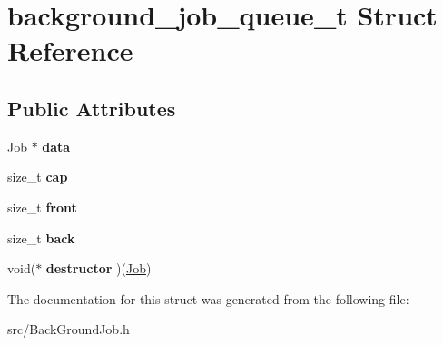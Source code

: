 \hypertarget{structbackground__job__queue__t}{\section{background\-\_\-job\-\_\-queue\-\_\-t Struct Reference}
\label{structbackground__job__queue__t}
}
\subsection*{Public Attributes}
\begin{DoxyCompactItemize}
\item 
\hypertarget{structbackground__job__queue__t_a8d3f674d7d98f8d7a212831d4599e713}{\hyperlink{structJob}{Job} $\ast$ {\bfseries data}}\label{structbackground__job__queue__t_a8d3f674d7d98f8d7a212831d4599e713}

\item 
\hypertarget{structbackground__job__queue__t_a8b5d447ed2865ebc3ad0c03a487be15b}{size\-\_\-t {\bfseries cap}}\label{structbackground__job__queue__t_a8b5d447ed2865ebc3ad0c03a487be15b}

\item 
\hypertarget{structbackground__job__queue__t_a3bfd2e392c40acaa625bd11955043f87}{size\-\_\-t {\bfseries front}}\label{structbackground__job__queue__t_a3bfd2e392c40acaa625bd11955043f87}

\item 
\hypertarget{structbackground__job__queue__t_a9364e62d5f7ade7af6b1a385e44fbae0}{size\-\_\-t {\bfseries back}}\label{structbackground__job__queue__t_a9364e62d5f7ade7af6b1a385e44fbae0}

\item 
\hypertarget{structbackground__job__queue__t_ab27da9c430edb2f3c88ed35a97cf7e12}{void($\ast$ {\bfseries destructor} )(\hyperlink{structJob}{Job})}\label{structbackground__job__queue__t_ab27da9c430edb2f3c88ed35a97cf7e12}

\end{DoxyCompactItemize}


The documentation for this struct was generated from the following file\-:\begin{DoxyCompactItemize}
\item 
src/Back\-Ground\-Job.\-h\end{DoxyCompactItemize}
